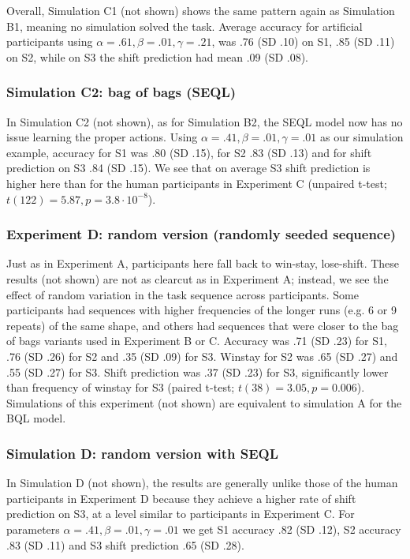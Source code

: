 \documentclass[10pt,letterpaper]{article}
\begin{document}
Overall, Simulation C1 (not shown) shows the same pattern again as Simulation B1, meaning no simulation solved the task. Average accuracy for artificial participants using $\alpha = .61, \beta = .01, \gamma = .21$, was .76 (SD .10) on S1, .85 (SD .11) on S2, while on S3 the shift prediction had mean .09 (SD .08).

\subsubsection{Simulation C2: bag of bags (SEQL)}

In Simulation C2 (not shown), as for Simulation B2, the SEQL model now has no issue learning the proper actions. Using $\alpha = .41, \beta = .01, \gamma = .01$ as our simulation example, accuracy for S1 was .80 (SD .15), for S2 .83 (SD .13) and for shift prediction on S3 .84 (SD .15). We see that on average S3 shift prediction is higher here than for the human participants in Experiment C (unpaired t-test; $t(122)=5.87, p=3.8\cdot10^{-8}$).

\subsubsection{Experiment D: random version (randomly seeded sequence)}

Just as in Experiment A, participants here fall back to win-stay, lose-shift. These results (not shown) are not as clearcut as in Experiment A; instead, we see the effect of random variation in the task sequence across participants. Some participants had sequences with higher frequencies of the longer runs (e.g. 6 or 9 repeats) of the same shape, and others had sequences that were closer to the bag of bags variants used in Experiment B or C. Accuracy was .71 (SD .23) for S1, .76 (SD .26) for S2 and .35 (SD .09) for S3. Winstay for S2 was .65 (SD .27) and .55 (SD .27) for S3. Shift prediction was .37 (SD .23) for S3, significantly lower than frequency of winstay for S3 (paired t-test; $t(38)=3.05, p=0.006$). Simulations of this experiment (not shown) are equivalent to simulation A for the BQL model.

\subsubsection{Simulation D: random version with SEQL}

In Simulation D (not shown), the results are generally unlike those of the human participants in Experiment D because they achieve a higher rate of shift prediction on S3, at a level similar to participants in Experiment C. For parameters $\alpha = .41, \beta = .01, \gamma = .01$ we get S1 accuracy .82 (SD .12), S2 accuracy .83 (SD .11) and S3 shift prediction .65 (SD .28).
\end{document}
